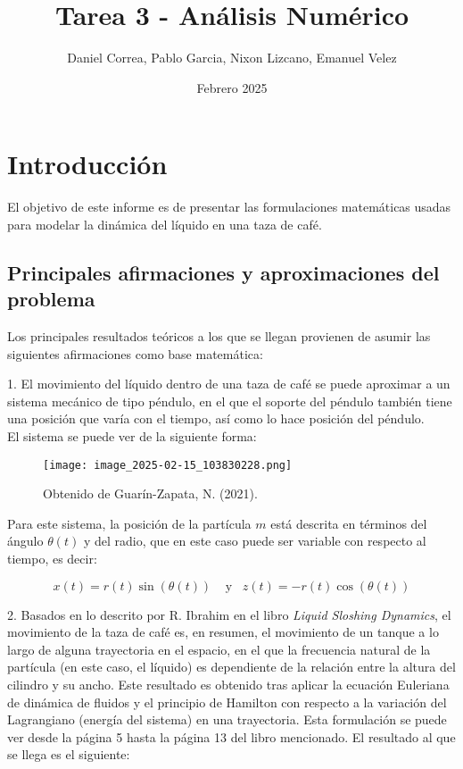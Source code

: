 \documentclass{article}
\title{Tarea 3 - Análisis Numérico}
\author{Daniel Correa, Pablo Garcia, Nixon Lizcano, Emanuel Velez}
\date{Febrero 2025}
\begin{document}
\maketitle

\section{Introducción}

El objetivo de este informe es de presentar las formulaciones matemáticas usadas para modelar la dinámica del líquido en una taza de café. 

\subsection{Principales afirmaciones y aproximaciones del problema}

Los principales resultados teóricos a los que se llegan provienen de asumir las siguientes afirmaciones como base matemática:

1. El movimiento del líquido dentro de una taza de café se puede aproximar a un sistema mecánico de tipo péndulo, en el que el soporte del péndulo también tiene una posición que varía con el tiempo, así como lo hace posición del péndulo.
\\

El sistema se puede ver de la siguiente forma:


\begin{wrapfigure}
    \centering
    \texttt{[image: image\_2025-02-15\_103830228.png]}
    \caption{Obtenido de Guarín-Zapata, N. (2021).}
\end{wrapfigure}

Para este sistema, la posición de la partícula $m$ está descrita en términos del ángulo $\theta(t)$ y del radio, que en este caso puede ser variable con respecto al tiempo, es decir:

$$
x(t) = r(t)\sin(\theta(t)) \; \; \; \; \text{y} \; \; \;
z(t) = -r(t)\cos(\theta(t))
$$


2. Basados en lo descrito por R. Ibrahim en el libro  \textit{Liquid Sloshing Dynamics}, el movimiento de la taza de café es, en resumen, el movimiento de un tanque a lo largo de alguna trayectoria en el espacio, en el que la frecuencia natural de la partícula (en este caso, el líquido) es dependiente de la relación entre la altura del cilindro y su ancho. Este resultado es obtenido tras aplicar la ecuación Euleriana de dinámica de fluidos y el principio de Hamilton con respecto a la variación del Lagrangiano (energía del sistema) en una trayectoria. Esta formulación se puede ver desde la página 5 hasta la página 13 del libro mencionado. El resultado al que se llega es el siguiente:
\end{document}

